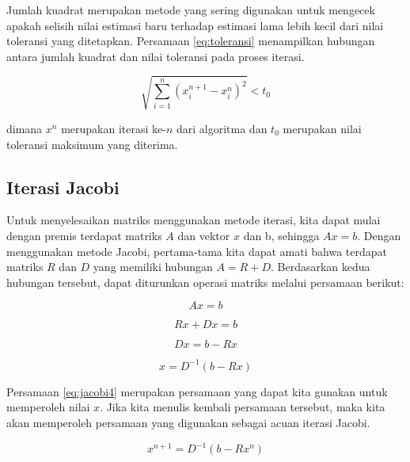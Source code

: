 \documentclass[
]{book}
\theoremstyle{definition}
\theoremstyle{definition}
\theoremstyle{definition}
\theoremstyle{definition}
\theoremstyle{remark}
\begin{document}
Jumlah kuadrat merupakan metode yang sering digunakan untuk mengecek apakah selisih nilai estimasi baru terhadap estimasi lama lebih kecil dari nilai toleransi yang ditetapkan. Persamaan \eqref{eq:toleransi} menampilkan hubungan antara jumlah kuadrat dan nilai toleransi pada proses iterasi.

\begin{equation}
\sqrt{\sum_{i=1}^n\left(x_i^{n+1}-x_i^{n}\right)^2}<t_0
 \label{eq:toleransi}
\end{equation}

dimana \(x^{n}\) merupakan iterasi ke-\(n\) dari algoritma dan \(t_0\) merupakan nilai toleransi maksimum yang diterima.

\hypertarget{jacobiiter}{%
\subsection{Iterasi Jacobi}\label{jacobiiter}}

Untuk menyelesaikan matriks menggunakan metode iterasi, kita dapat mulai dengan premis terdapat matriks \(A\) dan vektor \(x\) dan b, sehingga \(Ax = b\). Dengan menggunakan metode Jacobi, pertama-tama kita dapat amati bahwa terdapat matriks \(R\) dan \(D\) yang memiliki hubungan \(A = R + D\). Berdasarkan kedua hubungan tersebut, dapat diturunkan operasi matriks melalui persamaan berikut:

\begin{equation}
Ax=b
 \label{eq:jacobi}
\end{equation}

\begin{equation}
Rx+Dx=b
 \label{eq:jacobi2}
\end{equation}

\begin{equation}
Dx=b-Rx
 \label{eq:jacobi3}
\end{equation}

\begin{equation}
x=D^{-1}\left(b-Rx\right)
 \label{eq:jacobi4}
\end{equation}

Persamaan \eqref{eq:jacobi4} merupakan persamaan yang dapat kita gunakan untuk memperoleh nilai \(x\). Jika kita menulis kembali persamaan tersebut, maka kita akan memperoleh persamaan yang digunakan sebagai acuan iterasi Jacobi.

\begin{equation}
x^{n+1}=D^{-1}\left(b-Rx^{n}\right)
 \label{eq:jacobi5}
\end{equation}
\end{document}

